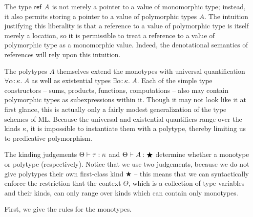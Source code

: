 \documentclass[12pt]{article}
\begin{document}
The type $\mbox{\textsf{{ref }}}A$ is not merely a pointer to a value of
monomorphic type; instead, it also permits storing a pointer to a
value of polymorphic types $A$. The intuition justifying this
liberality is that a reference to a value of polymorphic type is
itself merely a location, so it is permissible to treat a reference to
a value of polymorphic type as a monomorphic value. Indeed, the
denotational semantics of references will rely upon this intuition.

The polytypes $A$ themselves extend the monotypes with universal
quantification $\forall \alpha:\kappa.\;A$ as well as existential
types $\exists \alpha:\kappa.\;A$. Each of the simple type
constructors -- sums, products, functions, computations -- also may
contain polymorphic types as subexpressions within it. Though it may
not look like it at first glance, this is actually only a fairly modest
generalization of the type schemes of ML. Because the universal and
existential quantifiers range over the kinds $\kappa$, it is
impossible to instantiate them with a polytype, thereby limiting us to
predicative polymorphism. 

The kinding judgements ${\Theta} \vdash {\tau} : {\kappa}$ and
${\Theta} \vdash {A} : {\bigstar}$ determine whether a monotype or polytype
(respectively). Notice that we use two judgements, because we do not
give polytypes their own first-class kind $\bigstar$ -- this means
that we can syntactically enforce the restriction that the context
$\Theta$, which is a collection of type variables and their kinds, 
can only range over kinds which can contain only monotypes. 

First, we give the rules for the monotypes. 
\end{document}
